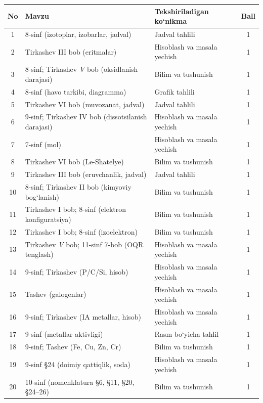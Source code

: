 \documentclass[11pt,a4paper]{article}
\begin{document}
{\small\noindent\begin{longtable}{|c|p{7.2cm}|p{5.4cm}|c|}\hline \textbf{No} & \textbf{Mavzu} & \textbf{Tekshiriladigan ko`nikma} & \textbf{Ball}\\\hline
1 & 8-sinf (izotoplar, izobarlar, jadval) & Jadval tahlili & 1\\\hline
2 & Tirkashev III bob (eritmalar) & Hisoblash va masala yechish & 1\\\hline
3 & 8-sinf; Tirkashev \textit{V} bob (oksidlanish darajasi) & Bilim va tushunish & 1\\\hline
4 & 8-sinf (havo tarkibi, diagramma) & Grafik tahlili & 1\\\hline
5 & Tirkashev VI bob (muvozanat, jadval) & Jadval tahlili & 1\\\hline
6 & 9-sinf; Tirkashev IV bob (dissotsilanish darajasi) & Hisoblash va masala yechish & 1\\\hline
7 & 7-sinf (mol) & Hisoblash va masala yechish & 1\\\hline
8 & Tirkashev VI bob (Le-Shatelye) & Bilim va tushunish & 1\\\hline
9 & Tirkashev III bob (eruvchanlik, jadval) & Jadval tahlili & 1\\\hline
10 & 8-sinf; Tirkashev II bob (kimyoviy bog`lanish) & Bilim va tushunish & 1\\\hline
11 & Tirkashev I bob; 8-sinf (elektron konfiguratsiya) & Bilim va tushunish & 1\\\hline
12 & Tirkashev I bob; 8-sinf (izoelektron) & Bilim va tushunish & 1\\\hline
13 & Tirkashev \textit{V} bob; 11-sinf 7-bob (OQR tenglash) & Hisoblash va masala yechish & 1\\\hline
14 & 9-sinf; Tirkashev (P/C/Si, hisob) & Hisoblash va masala yechish & 1\\\hline
15 & Tashev (galogenlar) & Hisoblash va masala yechish & 1\\\hline
16 & 9-sinf; Tirkashev (IA metallar, hisob) & Hisoblash va masala yechish & 1\\\hline
17 & 9-sinf (metallar aktivligi) & Rasm bo`yicha tahlil & 1\\\hline
18 & 9-sinf; Tashev (Fe, Cu, Zn, Cr) & Bilim va tushunish & 1\\\hline
19 & 9-sinf \S{}24 (doimiy qattiqlik, soda) & Hisoblash va masala yechish & 1\\\hline
20 & 10-sinf (nomenklatura \S{}6, \S{}11, \S{}20, \S{}24--26) & Bilim va tushunish & 1\\\hline

\end{longtable}}
\end{document}

